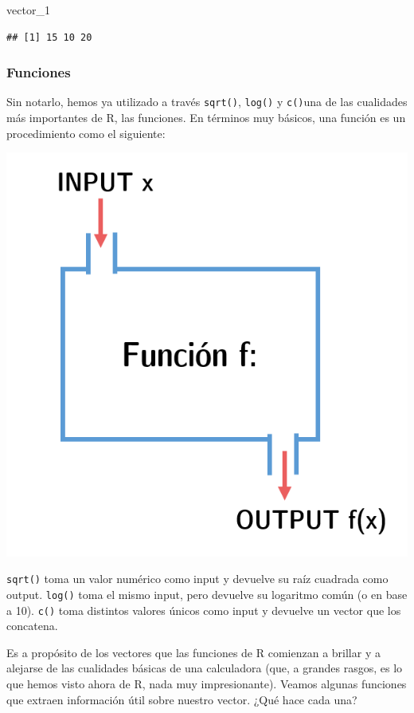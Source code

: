 \documentclass[]{book}
\newenvironment{Shaded}{\begin{snugshade}}{\end{snugshade}}
\newcommand{\DecValTok}[1]{\textcolor[rgb]{0.00,0.00,0.81}{#1}}
\newcommand{\NormalTok}[1]{#1}
\begin{document}
\begin{Shaded}
\begin{Highlighting}[]
\NormalTok{vector_}\DecValTok{1}
\end{Highlighting}
\end{Shaded}

\begin{verbatim}
## [1] 15 10 20
\end{verbatim}

\subsubsection{Funciones}\label{funciones}

Sin notarlo, hemos ya utilizado a través \texttt{sqrt()}, \texttt{log()}
y \texttt{c()}una de las cualidades más importantes de R, las funciones.
En términos muy básicos, una función es un procedimiento como el
siguiente:

\includegraphics[width=0.8\linewidth]{00-images/fig_3_3}

\texttt{sqrt()} toma un valor numérico como input y devuelve su raíz
cuadrada como output. \texttt{log()} toma el mismo input, pero devuelve
su logaritmo común (o en base a 10). \texttt{c()} toma distintos valores
únicos como input y devuelve un vector que los concatena.

Es a propósito de los vectores que las funciones de R comienzan a
brillar y a alejarse de las cualidades básicas de una calculadora (que,
a grandes rasgos, es lo que hemos visto ahora de R, nada muy
impresionante). Veamos algunas funciones que extraen información útil
sobre nuestro vector. ¿Qué hace cada una?
\end{document}
